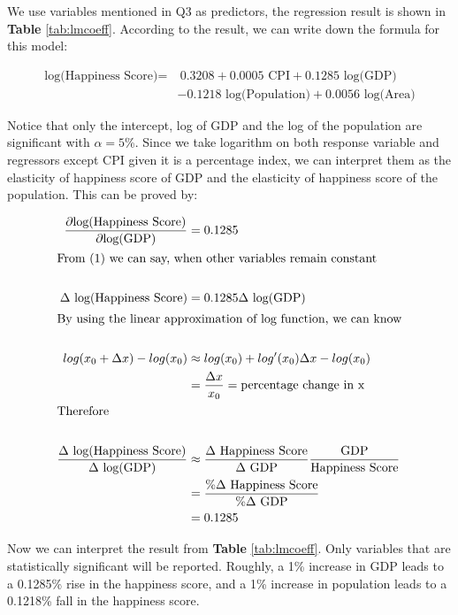 \documentclass[11pt,a4paper,]{article}
\begin{document}
We use variables mentioned in Q3 as predictors, the regression result is shown in \textbf{Table} \ref{tab:lmcoeff}. According to the result, we can write down the formula for this model:

\begin{align*}
\text{log(Happiness Score)} = & \ 0.3208 + 0.0005\text{ CPI} + 0.1285 \text{ log(GDP)} \\
&- 0.1218 \text{ log(Population)} + 0.0056 \text{ log(Area)}
\end{align*}

Notice that only the intercept, log of GDP and the log of the population are significant with \(\alpha = 5\)\%. Since we take logarithm on both response variable and regressors except CPI given it is a percentage index, we can interpret them as the elasticity of happiness score of GDP and the elasticity of happiness score of the population. This can be proved by:

\begin{align}
\frac{\partial \text{log(Happiness Score)}}{\partial \text{log(GDP)}} &= 0.1285\\
\intertext{From (1) we can say, when other variables remain constant }\nonumber \\
\Delta \text{ log(Happiness Score)} &= 0.1285 \Delta \text{ log(GDP)}\\
\intertext{By using the linear approximation of log function, we can know}\nonumber\\
log(x_0 + \Delta x) - log(x_0) &\approx log(x_0) + log'(x_0)\Delta x - log(x_0)\\
&=  \frac{\Delta x}{x_0} = \text{percentage change in x}\nonumber\\
\intertext{Therefore}\nonumber\\
\frac{\Delta \text{ log(Happiness Score)}}{\Delta \text{ log(GDP)}} &\approx \frac{\Delta \text{ Happiness Score}}{\Delta \text{ GDP} }\frac{\text{GDP}}{\text{Happiness Score}}\\
&=\frac{\% \Delta \text{ Happiness Score}}{\% \Delta \text{ GDP}} \nonumber\\
&= 0.1285\nonumber
\end{align}

Now we can interpret the result from \textbf{Table} \ref{tab:lmcoeff}. Only variables that are statistically significant will be reported. Roughly, a 1\% increase in GDP leads to a 0.1285\% rise in the happiness score, and a 1\% increase in population leads to a 0.1218\% fall in the happiness score.
\end{document}
